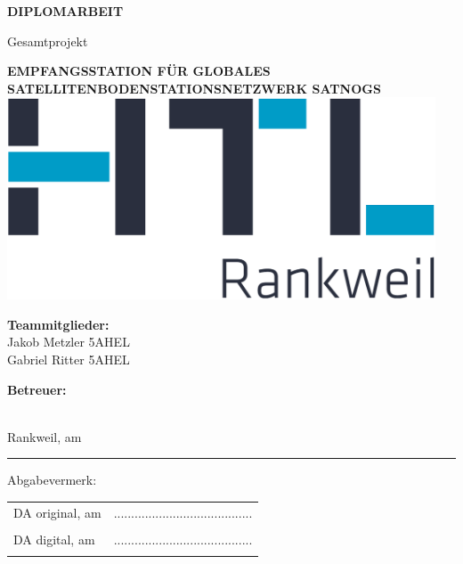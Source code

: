 \documentclass[hidelinks,12pt,a4paper,twoside]{report}
\begin{document}
	\begin{center}
		\textbf {\huge {\uppercase {Diplomarbeit}}}
		\par \large {Gesamtprojekt}
		\par \textbf {\huge {\uppercase {Empfangsstation für globales Satellitenbodenstationsnetzwerk SatNOGS}}}
		\vspace{0.3cm}
		\linebreak
		\includegraphics[frame, height=6cm]{../ref/HTL_Rankweil_logo.png}
	\end{center}
	
	\vfill %
	
	
	\begin{minipage}[t] {0.4\textwidth}
		\textbf{Teammitglieder:} \\
		Jakob Metzler \textbar{} 5AHEL \\
		Gabriel Ritter \textbar{} 5AHEL \\
	\end{minipage}
	\begin{minipage}[t] {0.4\textwidth}
		\textbf{Betreuer:} \\		
		\supervisor \\
	\end{minipage}
	
	\par Rankweil, am \PrintDate \\		
	
	\noindent\rule{\textwidth}{0.4pt}
	Abgabevermerk:
	\linebreak
	
	\begin{tabular}{p{7cm}C{6cm}}
		\hspace{1cm} DA original, am \PrintDate & ........................................ \\ 
		& \supervisor \\ [2.5em]
		
		\hspace{1cm} DA digital, am \PrintDate & ........................................ \\ 
		& \supervisor \\
	\end{tabular}
	
\end{document}
